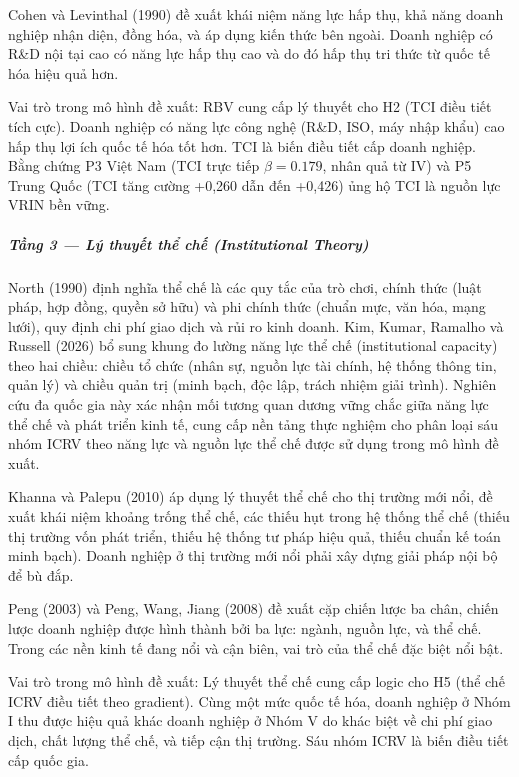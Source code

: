 \documentclass[12pt,a4paper]{article}
\begin{document}
Cohen và Levinthal (1990) đề xuất khái niệm năng lực hấp thụ, khả năng
doanh nghiệp nhận diện, đồng hóa, và áp dụng kiến thức bên ngoài. Doanh
nghiệp có R\&D nội tại cao có năng lực hấp thụ cao và do đó hấp thụ tri
thức từ quốc tế hóa hiệu quả hơn.

Vai trò trong mô hình đề xuất: RBV cung cấp lý thuyết cho H2 (TCI điều
tiết tích cực). Doanh nghiệp có năng lực công nghệ (R\&D, ISO, máy nhập
khẩu) cao hấp thụ lợi ích quốc tế hóa tốt hơn. TCI là biến điều tiết cấp
doanh nghiệp. Bằng chứng P3 Việt Nam (TCI trực tiếp \(\beta = 0.179\),
nhân quả từ IV) và P5 Trung Quốc (TCI tăng cường +0,260 dẫn đến +0,426)
ủng hộ TCI là nguồn lực VRIN bền vững.

\hypertarget{tux1ea7ng-3--luxfd-thuyux1ebft-thux1ec3-chux1ebf-institutional-theory}{%
\subparagraph{Tầng 3 --- Lý thuyết thể chế (Institutional
Theory)}\label{tux1ea7ng-3--luxfd-thuyux1ebft-thux1ec3-chux1ebf-institutional-theory}}

North (1990) định nghĩa thể chế là các quy tắc của trò chơi, chính thức
(luật pháp, hợp đồng, quyền sở hữu) và phi chính thức (chuẩn mực, văn
hóa, mạng lưới), quy định chi phí giao dịch và rủi ro kinh doanh. Kim,
Kumar, Ramalho và Russell (2026) bổ sung khung đo lường năng lực thể chế
(institutional capacity) theo hai chiều: chiều tổ chức (nhân sự, nguồn
lực tài chính, hệ thống thông tin, quản lý) và chiều quản trị (minh
bạch, độc lập, trách nhiệm giải trình). Nghiên cứu đa quốc gia này xác
nhận mối tương quan dương vững chắc giữa năng lực thể chế và phát triển
kinh tế, cung cấp nền tảng thực nghiệm cho phân loại sáu nhóm ICRV theo
năng lực và nguồn lực thể chế được sử dụng trong mô hình đề xuất.

Khanna và Palepu (2010) áp dụng lý thuyết thể chế cho thị trường mới
nổi, đề xuất khái niệm khoảng trống thể chế, các thiếu hụt trong hệ
thống thể chế (thiếu thị trường vốn phát triển, thiếu hệ thống tư pháp
hiệu quả, thiếu chuẩn kế toán minh bạch). Doanh nghiệp ở thị trường mới
nổi phải xây dựng giải pháp nội bộ để bù đắp.

Peng (2003) và Peng, Wang, Jiang (2008) đề xuất cặp chiến lược ba chân,
chiến lược doanh nghiệp được hình thành bởi ba lực: ngành, nguồn lực, và
thể chế. Trong các nền kinh tế đang nổi và cận biên, vai trò của thể chế
đặc biệt nổi bật.

Vai trò trong mô hình đề xuất: Lý thuyết thể chế cung cấp logic cho H5
(thể chế ICRV điều tiết theo gradient). Cùng một mức quốc tế hóa, doanh
nghiệp ở Nhóm I thu được hiệu quả khác doanh nghiệp ở Nhóm V do khác
biệt về chi phí giao dịch, chất lượng thể chế, và tiếp cận thị trường.
Sáu nhóm ICRV là biến điều tiết cấp quốc gia.
\end{document}
